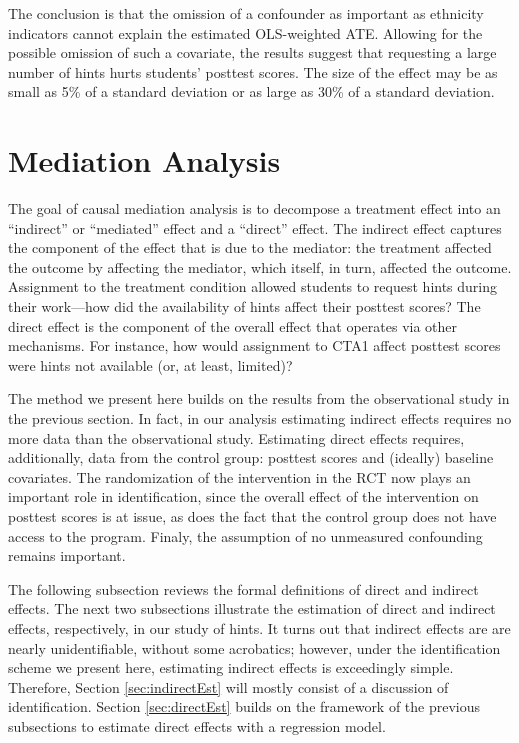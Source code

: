 \documentclass{article}\usepackage[]{graphicx}\usepackage[]{color}
\begin{document}
The conclusion is that the omission of a confounder as important as ethnicity indicators
cannot explain the estimated OLS-weighted ATE.
Allowing for the possible omission of such a covariate, the results suggest that requesting a
large number of hints hurts students' posttest scores.
The size of the effect may be as small as
5\% of a standard deviation
or as large as 30\% of a standard deviation.

\section{Mediation Analysis}\label{sec:mediation}
The goal of causal mediation analysis is to decompose a treatment
effect into an ``indirect'' or ``mediated''
effect and a ``direct'' effect.
The indirect effect captures the component of the effect that is due
to the mediator: the treatment affected the outcome by affecting the
mediator, which itself, in turn, affected the outcome.
Assignment to the treatment condition allowed students to request hints during their work---how did the availability of hints affect their posttest scores?
The direct effect is the component of the overall effect that operates via other mechanisms.
For instance, how would assignment to CTA1 affect posttest scores were hints not available (or, at least, limited)?


The method we present here builds on the results from the observational study in the previous section.
In fact, in our analysis estimating indirect effects requires no more data than the observational study.
Estimating direct effects requires, additionally, data from the control group: posttest scores and (ideally) baseline covariates.
The randomization of the intervention in the RCT now plays an important role in identification, since the overall effect of the intervention on posttest scores is at issue, as does the fact that the control group does not have access to the program.
Finaly, the assumption of no unmeasured confounding remains important.

The following subsection reviews the formal definitions of direct and indirect effects.
The next two subsections illustrate the estimation of direct and indirect effects, respectively, in our study of hints.
It turns out that indirect effects are are nearly unidentifiable, without some acrobatics; however, under the identification scheme we present here, estimating indirect effects is exceedingly simple.
Therefore, Section \ref{sec:indirectEst} will mostly consist of a discussion of identification.
Section \ref{sec:directEst} builds on the framework of the previous subsections to estimate direct effects with a regression model.
\end{document}
